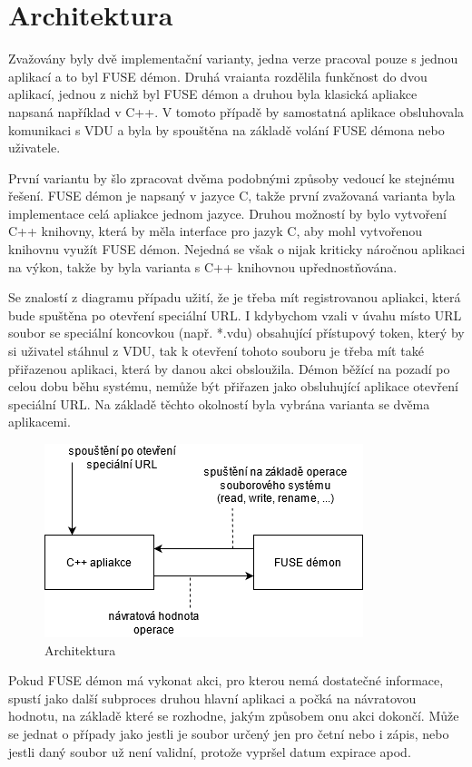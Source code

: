 \section{Architektura}

Zvažovány byly dvě implementační varianty, jedna verze pracoval pouze s jednou aplikací a to byl FUSE démon. Druhá vraianta rozdělila funkčnost do dvou aplikací, jednou 
z nichž byl FUSE démon a druhou byla klasická apliakce napsaná například v C++. V tomoto případě by samostatná aplikace obsluhovala komunikaci s VDU a byla by spouštěna
na základě volání FUSE démona nebo uživatele.

První variantu by šlo zpracovat dvěma podobnými způsoby vedoucí ke stejnému řešení. FUSE démon je napsaný v jazyce C, takže první zvažovaná varianta byla implementace
celá apliakce jednom jazyce. Druhou možností by bylo vytvoření C++ knihovny, která by měla interface pro jazyk C, aby mohl vytvořenou knihovnu využít FUSE démon. Nejedná se
však o nijak kriticky náročnou aplikaci na výkon, takže by byla varianta s C++ knihovnou upřednostňována.

Se znalostí z diagramu případu užití, že je třeba mít registrovanou apliakci, která bude spuštěna po otevření speciální URL. I kdybychom vzali v úvahu místo URL soubor
se speciální koncovkou (např. *.vdu) obsahující přístupový token, který by si uživatel stáhnul z VDU, tak k otevření tohoto souboru je třeba mít také přiřazenou aplikaci, která
by danou akci obsloužila. Démon běžící na pozadí po celou dobu běhu systému, nemůže být přiřazen jako obsluhující aplikace otevření speciální URL. Na základě těchto okolností
byla vybrána varianta se dvěma aplikacemi.

\begin{figure}[h]
    \centering
    \includegraphics[width=0.47\linewidth]{other-fig/architecture.png}
    \caption{Architektura}
\end{figure}

Pokud FUSE démon má vykonat akci, pro kterou nemá dostatečné informace, spustí jako další subproces druhou hlavní aplikaci a počká na návratovou hodnotu, na základě
které se rozhodne, jakým způsobem onu akci dokončí. Může se jednat o případy jako jestli je soubor určený jen pro četní nebo i zápis, nebo jestli daný soubor už není
validní, protože vypršel datum expirace apod.

